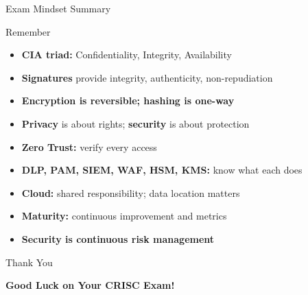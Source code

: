 \documentclass{beamer}
\begin{document}
	\begin{frame}{Exam Mindset Summary}
		\begin{block}{Remember}
			\begin{itemize}
				\item \textbf{CIA triad:} Confidentiality, Integrity, Availability
				\item \textbf{Signatures} provide integrity, authenticity, non-repudiation
				\item \textbf{Encryption is reversible; hashing is one-way}
				\item \textbf{Privacy} is about rights; \textbf{security} is about protection
				\item \textbf{Zero Trust:} verify every access
				\item \textbf{DLP, PAM, SIEM, WAF, HSM, KMS:} know what each does
				\item \textbf{Cloud:} shared responsibility; data location matters
				\item \textbf{Maturity:} continuous improvement and metrics
				\item \textbf{Security is continuous risk management}
			\end{itemize}
		\end{block}
	\end{frame}
	
	\begin{frame}{Thank You}
		\begin{center}
			{\Huge \textbf{Good Luck on Your CRISC Exam!}}
		\end{center}
	\end{frame}
	
\end{document}
